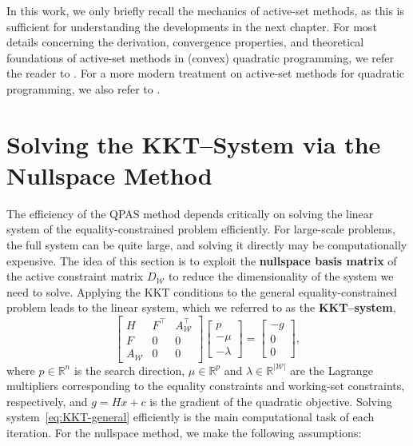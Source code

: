 \documentclass{book}
\theoremstyle{definition}
\numberwithin{algorithm_}{chapter}
\begin{document}
\bigskip

In this work, we only briefly recall the mechanics of active-set methods, as this is sufficient for understanding the developments in the next chapter. For most details concerning the derivation, convergence properties, and theoretical foundations of active-set methods in (convex) quadratic programming, we refer the reader to \cite{nocedal2006numerical, fletcher1971quadratic}.
For a more modern treatment on active-set methods for quadratic programming, we also refer to \cite{wong2011activeset}.





\newpage




\section{Solving the KKT--System via the Nullspace Method}

The efficiency of the QPAS method depends critically on solving the linear system of the equality-constrained problem efficiently. For large-scale problems, the full system can be quite large, and solving it directly may be computationally expensive. The idea of this section is to exploit the \textbf{nullspace basis matrix} of the active constraint matrix $D_{\mathcal{W}}$ to reduce the dimensionality of the system we need to solve.
Applying the KKT conditions to the general equality-constrained problem leads to the linear system, which we referred to as the \textbf{KKT--system},
\begin{equation} \label{eq:KKT-general}
\begin{bmatrix}
H & F^\top & A_{\mathcal{W}}^\top \\
F & 0 & 0 \\
A_{\mathcal{W}} & 0 & 0
\end{bmatrix}
\begin{bmatrix}
p \\ -\mu \\ -\lambda
\end{bmatrix}
=
\begin{bmatrix}
- g \\ 0 \\ 0
\end{bmatrix},
\end{equation}
where $p \in \mathbb{R}^n$ is the search direction, $\mu \in \mathbb{R}^p$ and $\lambda \in \mathbb{R}^{|\mathcal{W}|}$ are the Lagrange multipliers corresponding to the equality constraints and working-set constraints, respectively, and $g = H x + c$ is the gradient of the quadratic objective. Solving system~\eqref{eq:KKT-general} efficiently is the main computational task of each iteration.
For the nullspace method, we make the following assumptions:
\end{document}
